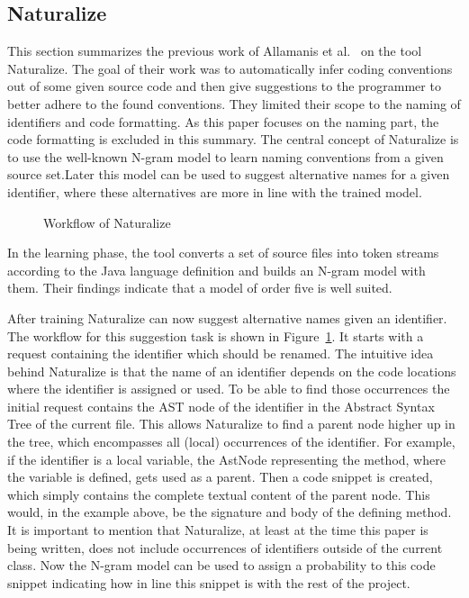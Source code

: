 \subsection{Naturalize}
This section summarizes the previous work of Allamanis et al.~\cite{naturalize} on the tool Naturalize.
The goal of their work was to automatically infer coding conventions out of some given source code
and then give suggestions to the programmer to better adhere to the found conventions.
They limited their scope to the naming of identifiers and code formatting. 
As this paper focuses on the naming part, the code formatting is excluded in this summary. 
The central concept of Naturalize is to use the well-known N-gram model to learn naming conventions from a given source set.Later this model can be used to suggest alternative names for a given identifier, where these alternatives are more in line with the trained model. 
\begin{figure}
    \centering
    \graphicspath{{resources/}}  
    \def\svgwidth{0.5\textwidth}
    
    \caption{Workflow of Naturalize}
    \label{fig:back_nat_workflow}
\end{figure}

In the learning phase, the tool converts a set of source files into token streams according to the
Java language definition and builds an N-gram model with them. Their findings indicate that a model of
order five is well suited.

After training Naturalize can now suggest alternative names given an identifier. The workflow for this suggestion task is shown in Figure~\ref{fig:back_nat_workflow}.
It starts with a request containing the identifier which should be renamed.
The intuitive idea behind Naturalize is that the name of an identifier depends on the code locations where the identifier is assigned or used. To be able to find those occurrences the initial request contains the AST node of the identifier in the Abstract Syntax Tree
of the current file. This allows Naturalize to find a parent node higher up in the tree, which encompasses all (local) occurrences of the identifier. For example, if the identifier is a local variable, the AstNode representing the method, where the variable is defined, gets used as a parent. Then a code snippet is created, which simply contains the complete textual content of the parent node. This would, in the example above, be the signature and body of the defining method. It is important to mention that Naturalize, at least at the time this paper is being written,
does not include occurrences of identifiers outside of the current class. Now the N-gram model can be used to assign a probability to this code snippet indicating how in line this snippet is with the rest of the project.

